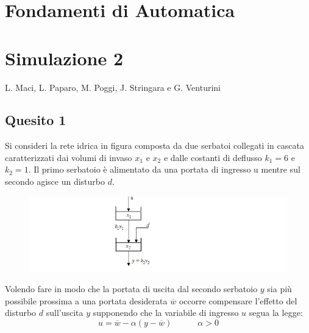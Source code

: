 \documentclass[a4paper]{report}
\begin{document}
\begin{center}
\section*{Fondamenti di Automatica}
\section*{Simulazione 2}
L. Maci, L. Paparo, M. Poggi, J. Stringara e G. Venturini
\end{center}
\subsection*{Quesito 1}
Si consideri la rete idrica in figura composta da due serbatoi collegati in cascata caratterizzati dai
volumi di invaso $x_1$ e $x_2$ e dalle costanti di deflusso $k_1 = 6$ e $k_2 = 1$. Il primo serbatoio è alimentato da
una portata di ingresso u mentre sul secondo agisce un disturbo $d$.
\begin{figure}[h]
\includegraphics[width=\textwidth]{sysgraf}
\end{figure}\newline
Volendo fare in modo che la portata di uscita dal
secondo serbatoio $y$ sia più possibile prossima
a una portata  desiderata  $\overline{w}$  
occorre  compensare  l’effetto  del  disturbo  $d$
sull’uscita $y$  supponendo  che  la  variabile di 
ingresso $u$ segua la legge:
\[
  u=\overline{w}-\alpha(y-\overline{w})\quad \quad \quad \alpha >0
\]
\end{document}
